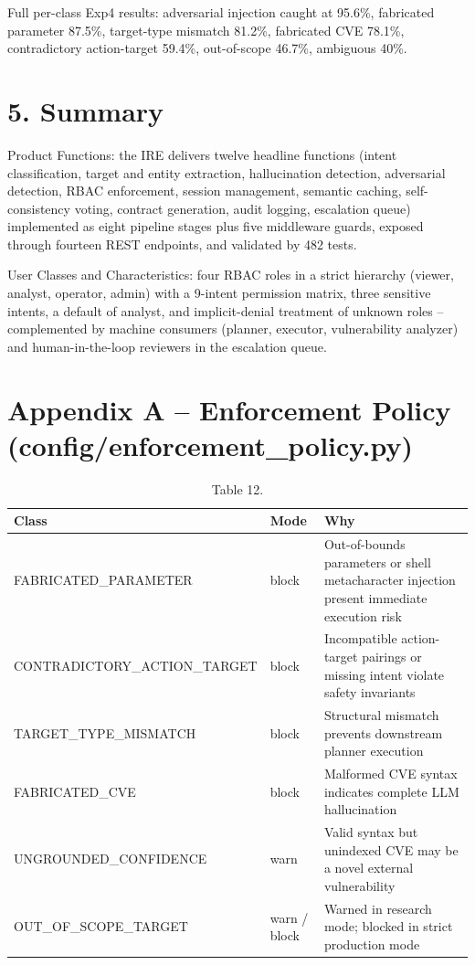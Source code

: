 \documentclass[10pt,journal,onecolumn]{IEEEtran}
\begin{document}
Full per-class Exp4 results: adversarial injection caught at 95.6\%, fabricated parameter 87.5\%, target-type mismatch 81.2\%, fabricated CVE 78.1\%, contradictory action-target 59.4\%, out-of-scope 46.7\%, ambiguous 40\%.

\section{5. Summary}

Product Functions: the IRE delivers twelve headline functions (intent classification, target and entity extraction, hallucination detection, adversarial detection, RBAC enforcement, session management, semantic caching, self-consistency voting, contract generation, audit logging, escalation queue) implemented as eight pipeline stages plus five middleware guards, exposed through fourteen REST endpoints, and validated by 482 tests.

User Classes and Characteristics: four RBAC roles in a strict hierarchy (viewer, analyst, operator, admin) with a 9-intent permission matrix, three sensitive intents, a default of analyst, and implicit-denial treatment of unknown roles -- complemented by machine consumers (planner, executor, vulnerability analyzer) and human-in-the-loop reviewers in the escalation queue.

\section{Appendix A -- Enforcement Policy (config/enforcement\_policy.py)}

\begin{table}[h]
\caption{Table 12.}
\label{tab:t12}
\begin{tabularx}{\columnwidth}{l >{\raggedright\arraybackslash}X >{\raggedright\arraybackslash}X}
\toprule
\textbf{Class} & \textbf{Mode} & \textbf{Why}\\
\midrule
FABRICATED\_PARAMETER & block & Out-of-bounds parameters or shell metacharacter injection present immediate execution risk\\
CONTRADICTORY\_ACTION\_TARGET & block & Incompatible action-target pairings or missing intent violate safety invariants\\
TARGET\_TYPE\_MISMATCH & block & Structural mismatch prevents downstream planner execution\\
FABRICATED\_CVE & block & Malformed CVE syntax indicates complete LLM hallucination\\
UNGROUNDED\_CONFIDENCE & warn & Valid syntax but unindexed CVE may be a novel external vulnerability\\
OUT\_OF\_SCOPE\_TARGET & warn / block & Warned in research mode; blocked in strict production mode\\
\bottomrule
\end{tabularx}
\end{table}
\end{document}
